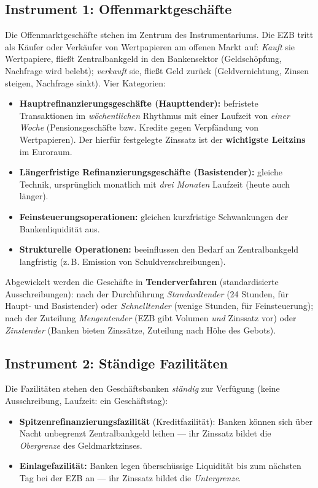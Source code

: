 \documentclass[11pt, a4paper]{article}
\begin{document}
\subsection{Instrument 1: Offenmarktgeschäfte}

Die Offenmarktgeschäfte stehen im Zentrum des Instrumentariums. Die EZB tritt als Käufer
oder Verkäufer von Wertpapieren am offenen Markt auf: \emph{Kauft} sie Wertpapiere, fließt
Zentralbankgeld in den Bankensektor (Geldschöpfung, Nachfrage wird belebt); \emph{verkauft}
sie, fließt Geld zurück (Geldvernichtung, Zinsen steigen, Nachfrage sinkt). Vier Kategorien:

\begin{itemize}
  \item \textbf{Hauptrefinanzierungsgeschäfte (Haupttender):} befristete Transaktionen im
    \emph{wöchentlichen} Rhythmus mit einer Laufzeit von \emph{einer Woche}
    (Pensionsgeschäfte bzw. Kredite gegen Verpfändung von Wertpapieren). Der hierfür
    festgelegte Zinssatz ist der \textbf{wichtigste Leitzins} im Euroraum.
  \item \textbf{Längerfristige Refinanzierungsgeschäfte (Basistender):} gleiche Technik,
    ursprünglich monatlich mit \emph{drei Monaten} Laufzeit (heute auch länger).
  \item \textbf{Feinsteuerungsoperationen:} gleichen kurzfristige Schwankungen der
    Bankenliquidität aus.
  \item \textbf{Strukturelle Operationen:} beeinflussen den Bedarf an Zentralbankgeld
    langfristig (z.\,B. Emission von Schuldverschreibungen).
\end{itemize}

Abgewickelt werden die Geschäfte in \textbf{Tenderverfahren} (standardisierte
Ausschreibungen): nach der Durchführung \emph{Standardtender} (24 Stunden, für Haupt- und
Basistender) oder \emph{Schnelltender} (wenige Stunden, für Feinsteuerung); nach der
Zuteilung \emph{Mengentender} (EZB gibt Volumen \emph{und} Zinssatz vor) oder
\emph{Zinstender} (Banken bieten Zinssätze, Zuteilung nach Höhe des Gebots).

\subsection{Instrument 2: Ständige Fazilitäten}

Die Fazilitäten stehen den Geschäftsbanken \emph{ständig} zur Verfügung (keine
Ausschreibung, Laufzeit: ein Geschäftstag):

\begin{itemize}
  \item \textbf{Spitzenrefinanzierungsfazilität} (Kreditfazilität): Banken können sich
    über Nacht unbegrenzt Zentralbankgeld leihen --- ihr Zinssatz bildet die
    \emph{Obergrenze} des Geldmarktzinses.
  \item \textbf{Einlagefazilität:} Banken legen überschüssige Liquidität bis zum nächsten
    Tag bei der EZB an --- ihr Zinssatz bildet die \emph{Untergrenze}.
\end{itemize}
\end{document}
